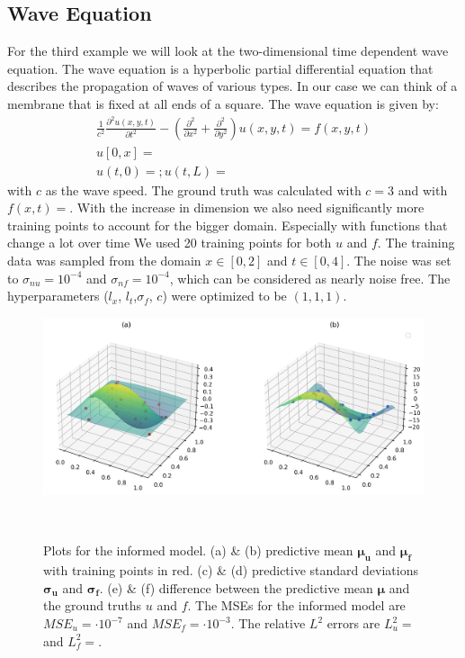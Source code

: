 \documentclass{article}
\begin{document}
\subsection{Wave Equation}
For the third example we will look at the two-dimensional time dependent wave equation. The wave equation is a hyperbolic partial differential equation that describes the propagation of waves of various types. In our case we can think of a membrane that is fixed at all ends of a square. The wave equation is given by:
\begin{equation}
    \begin{aligned}
        \frac{1}{c^2} \frac{\partial^2 u(x,y,t)}{\partial t^2} - (\frac{\partial^2}{\partial x^2} +\frac{\partial^2}{\partial y^2})u(x,y,t) = f(x,y,t) \\ u[0,x] =\\ u(t,0) = ; u(t,L) =
    \end{aligned}
\end{equation}
with $c$ as the wave speed. The ground truth was calculated with $c = 3$ and with $f(x,t) = $. With the increase in dimension we also need significantly more training points to account for the bigger domain. Especially with functions that change a lot over time    We used 20 training points for both $u$ and $f$. The training data was sampled from the domain $x \in [0,2]$ and $t \in [0,4]$. The noise was set to $\sigma_{nu} = 10^{-4}$ and $\sigma_{nf} = 10^{-4}$, which can be considered as nearly noise free. The hyperparameters ($l_x$, $l_t$,$\sigma_f$, $c$) were optimized to be $(1,1,1)$. 
\begin{figure}
    \centering
    \includegraphics[width=1\textwidth]{../final_examples/wave_equation/predictive_mean.png}
    \caption{Plots for the informed model. (a) \& (b) predictive mean $\bm{\mu_u}$ and $\bm{\mu_f}$ with training points in red. (c) \& (d) predictive standard deviations $\bm{\sigma_u}$ and $\bm{\sigma_f}$. (e) \& (f) difference between the predictive mean $\bm{\mu}$ and the ground truths $u$ and $f$. The MSEs for the informed model are $MSE_u =  \cdot 10^{-7}$ and $MSE_f =  \cdot 10^{-3}$. The relative $L^2$ errors are $L^2_u = $ and $L^2_f = $.}
    ~\label{fig:wave}
\end{figure}
\end{document}

